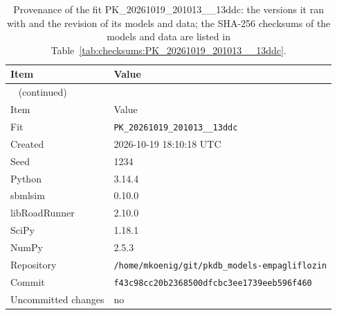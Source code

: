 \documentclass{article}
\begin{document}
\begin{longtable}{ll}
\caption{Provenance of the fit PK\_20261019\_201013\_\_13ddc: the versions it ran with and the revision of its models and data; the SHA-256 checksums of the models and data are listed in Table~\ref{tab:checksums:PK_20261019_201013__13ddc}.}\label{tab:provenance:PK_20261019_201013__13ddc} \\
\toprule
Item & Value \\
\midrule
\endfirsthead
\multicolumn{2}{l}{\small\tablename~\thetable{} (continued)} \\
\toprule
Item & Value \\
\midrule
\endhead
\bottomrule
\endlastfoot
Fit & \texttt{PK\_20261019\_201013\_\_13ddc} \\
Created & 2026-10-19 18:10:18 UTC \\
Seed & 1234 \\
Python & 3.14.4 \\
sbmlsim & 0.10.0 \\
libRoadRunner & 2.10.0 \\
SciPy & 1.18.1 \\
NumPy & 2.5.3 \\
Repository & \texttt{/home/mkoenig/git/pkdb\_models-empagliflozin} \\
Commit & \texttt{f43c98cc20b2368500dfcbc3ee1739eeb596f460} \\
Uncommitted changes & no \\
\end{longtable}



\end{document}
